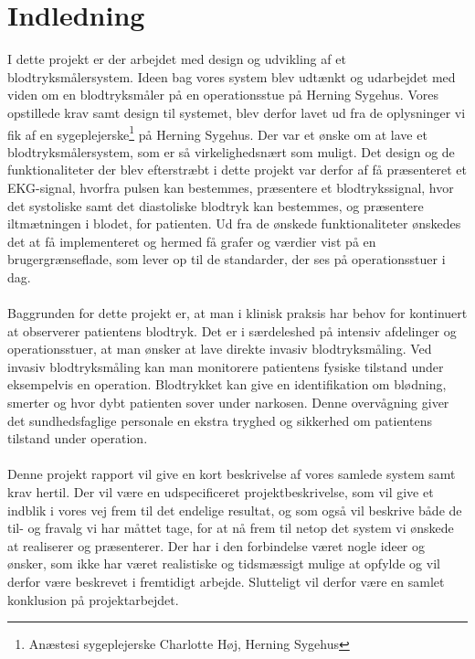 \chapter{Indledning}
I dette projekt er der arbejdet med design og udvikling af et blodtryksmålersystem. Ideen bag vores system blev udtænkt og udarbejdet med viden om en blodtryksmåler på en operationsstue på Herning Sygehus. Vores opstillede krav samt design til systemet, blev derfor lavet ud fra de oplysninger vi fik af en sygeplejerske\footnote{Anæstesi sygeplejerske Charlotte Høj, Herning Sygehus} på Herning Sygehus. Der var et ønske om at lave et blodtryksmålersystem, som er så virkelighedsnært som muligt. Det design og de funktionaliteter der blev efterstræbt i dette projekt var derfor af få præsenteret et EKG-signal, hvorfra pulsen kan bestemmes, præsentere et blodtrykssignal, hvor det systoliske samt det diastoliske blodtryk kan bestemmes, og præsentere iltmætningen i blodet, for patienten. Ud fra de ønskede funktionaliteter ønskedes det at få implementeret og hermed få grafer og værdier vist på en brugergrænseflade, som lever op til de standarder, der ses på operationsstuer i dag. \\
\\
Baggrunden for dette projekt er, at man i klinisk praksis har behov for kontinuert at observerer patientens blodtryk. Det er i særdeleshed på intensiv afdelinger og operationsstuer, at man ønsker at lave direkte invasiv blodtryksmåling. Ved invasiv blodtryksmåling kan man monitorere patientens fysiske tilstand under eksempelvis en operation. Blodtrykket kan give en identifikation om blødning, smerter og hvor dybt patienten sover under narkosen. Denne overvågning giver det sundhedsfaglige personale en ekstra tryghed og sikkerhed om patientens tilstand under operation. \\
\\
Denne projekt rapport vil give en kort beskrivelse af vores samlede system samt krav hertil. Der vil være en udspecificeret projektbeskrivelse, som vil give et indblik i vores vej frem til det endelige resultat, og som også vil beskrive både de til- og fravalg vi har måttet tage, for at nå frem til netop det system vi ønskede at realiserer og præsenterer. Der har i den forbindelse været nogle ideer og ønsker, som ikke har været realistiske og tidsmæssigt mulige at opfylde og vil derfor være beskrevet i fremtidigt arbejde. Slutteligt vil derfor være en samlet konklusion på projektarbejdet.
